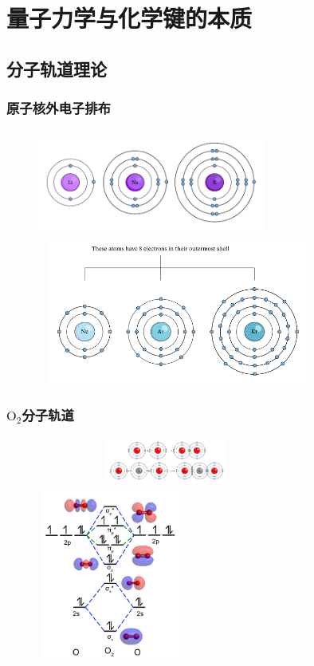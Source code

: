 \section{量子力学与化学键的本质}
\subsection{分子轨道理论}
\frame
{
	\frametitle{原子核外电子排布}
\begin{figure}[h!]
\vspace*{-0.35in}
\centering
\includegraphics[height=1.35in,width=2.95in,viewport=0 0 500 230,clip]{Figures/Li-Na-K.png}
\includegraphics[height=1.92in,width=3.65in,viewport=0 0 500 275,clip]{Figures/Ne-Ar-Kr.png}
\label{Electron_in_atom}
\end{figure}
}

\frame
{
	\frametitle{$\mathrm{O}_2$分子轨道}
\begin{figure}[h!]
\centering
\vspace{-15.5pt}
\includegraphics[height=0.60in,width=3.35in,viewport=0 100 500 200,clip]{Figures/Octet-Rule-O2_CO2.png}
\includegraphics[height=2.25in,width=1.90in,viewport=0 0 150 170,clip]{Figures/MO-O2.png}
\label{MO:O2}
\end{figure}
}

